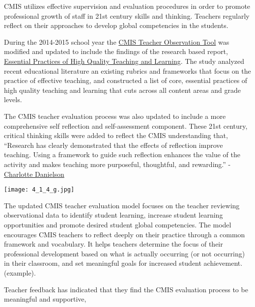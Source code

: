 
\begin{findings}
CMIS utilizes effective supervision and evaluation procedures in order to promote professional growth of staff in 21st century skills and thinking. Teachers regularly reflect on their approaches to develop global competencies in the students.

During the 2014-2015 school year the \href{https://docs.google.com/document/d/15_5X5QtixmWVheEUBVO9N1aislsLDm_ZW4-4g4YQ7F4/edit?usp=sharing}{CMIS Teacher Observation Tool} was modified and updated to include the findings of the research based report, \href{https://drive.google.com/a/cmis.ac.th/file/d/0Bwny3HLdIIS7bXJ0dEpCWG51MTQ/view?usp=sharing}{Essential Practices of High Quality Teaching and Learning}. The study analyzed recent educational literature an existing rubrics and frameworks that focus on the practice of effective teaching, and constructed a list of core, essential practices of high quality teaching and learning that cuts across all content areas and grade levels. 

The CMIS teacher evaluation process was also updated to include a more comprehensive self reflection and self-assessment component. These 21st century, critical thinking skills were added to reflect the CMIS understanding that, ``Research has clearly demonstrated that the effects of reflection improve teaching. Using a framework to guide such reflection enhances the value of the activity and makes teaching more purposeful, thoughtful, and rewarding.'' -\href{http://www.ascd.org/publications/books/106034/chapters/Using-the-Framework.aspx}{Charlotte Danielson} 

\texttt{[image: 4\_1\_4\_g.jpg]}

The updated CMIS teacher evaluation model focuses on the teacher reviewing observational data to identify student learning, increase student learning opportunities and promote desired student global competencies. The  model encourages CMIS teachers to reflect deeply on their practice through a common framework and vocabulary. It helps teachers determine the focus of their professional development based on what is actually occurring (or not occurring) in their classroom, and set meaningful goals for increased student achievement. (example).

Teacher feedback has indicated that they find the CMIS evaluation process to be meaningful and supportive,  


\end{findings}

